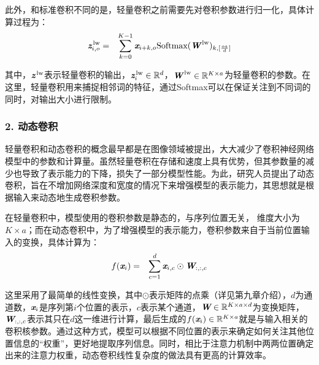 \parinterval 此外，和标准卷积不同的是，轻量卷积之前需要先对卷积参数进行归一化，具体计算过程为：
\begin{eqnarray}
\textbf{\em z}_{i,o}^\textrm{\,lw} &=& \sum_{k=0}^{K-1} \textbf{\em x}_{i+k,o} \textrm{Softmax}(\textbf{\em W}^\textrm{\,lw})_{k,[\frac{oa}{d}]}
\label{eq:11-21}
\end{eqnarray}

\noindent 其中，$\textbf{\em z}^\textrm{\,lw}$表示轻量卷积的输出，$\textbf{\em z}_i^\textrm{\,lw} \in \mathbb{R}^d $，$\textbf{\em W}^\textrm{\,lw} \in \mathbb{R}^{K\times a}$为轻量卷积的参数。在这里，轻量卷积用来捕捉相邻词的特征，通过Softmax可以在保证关注到不同词的同时，对输出大小进行限制。

\subsubsection{2. 动态卷积}

\parinterval 轻量卷积和动态卷积的概念最早都是在图像领域被提出，大大减少了卷积神经网络模型中的参数和计算量。虽然轻量卷积在存储和速度上具有优势，但其参数量的减少也导致了表示能力的下降，损失了一部分模型性能。为此，研究人员提出了动态卷积，旨在不增加网络深度和宽度的情况下来增强模型的表示能力，其思想就是根据输入来动态地生成卷积参数。

\parinterval 在轻量卷积中，模型使用的卷积参数是静态的，与序列位置无关， 维度大小为$K\times a$；而在动态卷积中，为了增强模型的表示能力，卷积参数来自于当前位置输入的变换，具体计算为：
\begin{eqnarray}
{f} (\textbf{\em x}_{i}) &=& \sum_{c=1}^d \textbf{\em x}_{i,c} \odot \textbf{\em W}_{:,:,c}
\label{eq:11-22}
\end{eqnarray}

\parinterval 这里采用了最简单的线性变换，其中$\odot$表示矩阵的点乘（详见第九章介绍），$d$为通道数，$\textbf{\em x}_i$是序列第$i$个位置的表示，$c$表示某个通道，$\textbf{\em W} \in \mathbb{R}^{K \times a \times d}$为变换矩阵，$\textbf{\em W}_{:,:,c}$表示其只在$d$这一维进行计算，最后生成的${f} (\textbf{\em x}_i)\in \mathbb{R}^{K \times a}$就是与输入相关的卷积核参数。通过这种方式，模型可以根据不同位置的表示来确定如何关注其他位置信息的“权重”，更好地提取序列信息。同时，相比于注意力机制中两两位置确定出来的注意力权重，动态卷积线性复杂度的做法具有更高的计算效率。

